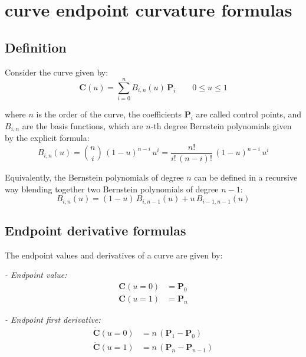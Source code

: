 \section{\Bezier curve endpoint curvature formulas}
\subsection{Definition}
\label{sec:bezier}

Consider the \Bezier curve given by:
\begin{equation}
\label{eq:def_bezier_curve}
\mathbf{C}(u)=\sum_{i=0}^{n} B_{i,n}(u)\, \mathbf{P}_{i} \quad \quad 0 \leq u \leq 1
\end{equation}

where $n$ is the order of the curve, the coefficients $\mathbf{P}_{i}$ are called control points, and $B_{i,n}$ are the basis functions, which are $n$-th degree Bernstein polynomials given by the explicit formula:
\begin{equation}
    \label{eq:def_bernstein_explicit}
    B_{i,n}(u) = \binom{n}{i}  \, (1-u)^{n-i} \, u^{i} = \frac{n!}{i! \, (n-i)!} \, (1-u)^{n-i} \, u^{i}  
\end{equation}

Equivalently, the Bernstein polynomials of degree $n$ can be defined in a recursive way blending together two Bernstein polynomials of degree $n-1$:
\begin{equation}
    \label{eq:def_bernstein_recursive}
    B_{i,n}(u) = (1-u) \, B_{i,n-1}(u) + u \, B_{i-1,n-1}(u)
\end{equation}



\subsection{Endpoint derivative formulas}

The endpoint values and derivatives of a \Bezier curve are given by:

\textit{- Endpoint value:}
    \begin{align*}
        \mathbf{C}(u=0) &= \mathbf{P}_{0} \\
        \mathbf{C}(u=1) &= \mathbf{P}_{n}
    \end{align*}
    
\textit{- Endpoint first derivative:}
    \begin{align*}
        \mathbf{\dot{C}}(u=0) &= n \,(\mathbf{P}_{1} - \mathbf{P}_{0}) \\
        \mathbf{\dot{C}}(u=1) &= n \,(\mathbf{P}_{n} - \mathbf{P}_{n-1})
    \end{align*}

